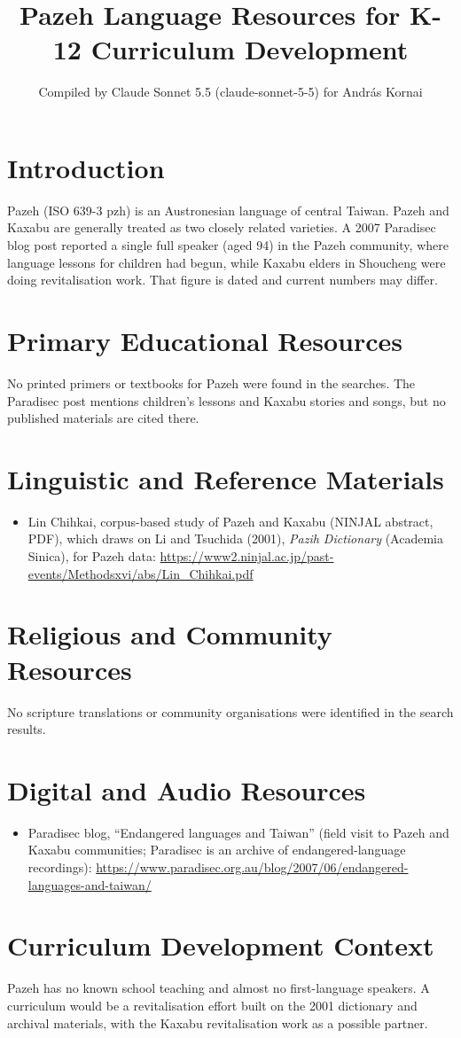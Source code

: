 \documentclass[12pt]{article}
\title{Pazeh Language Resources for K-12 Curriculum Development}
\author{Compiled by Claude Sonnet 5.5 (claude-sonnet-5-5) for Andr\'as Kornai}
\date{}
\begin{document}
\maketitle

\section{Introduction}
Pazeh (ISO 639-3 pzh) is an Austronesian language of central Taiwan. Pazeh and Kaxabu are generally treated as two closely related varieties. A 2007 Paradisec blog post reported a single full speaker (aged 94) in the Pazeh community, where language lessons for children had begun, while Kaxabu elders in Shoucheng were doing revitalisation work. That figure is dated and current numbers may differ.

\section{Primary Educational Resources}
No printed primers or textbooks for Pazeh were found in the searches. The Paradisec post mentions children's lessons and Kaxabu stories and songs, but no published materials are cited there.

\section{Linguistic and Reference Materials}
\begin{itemize}
\item Lin Chihkai, corpus-based study of Pazeh and Kaxabu (NINJAL abstract, PDF), which draws on Li and Tsuchida (2001), \emph{Pazih Dictionary} (Academia Sinica), for Pazeh data: \url{https://www2.ninjal.ac.jp/past-events/Methodsxvi/abs/Lin_Chihkai.pdf}
\end{itemize}

\section{Religious and Community Resources}
No scripture translations or community organisations were identified in the search results.

\section{Digital and Audio Resources}
\begin{itemize}
\item Paradisec blog, ``Endangered languages and Taiwan'' (field visit to Pazeh and Kaxabu communities; Paradisec is an archive of endangered-language recordings): \url{https://www.paradisec.org.au/blog/2007/06/endangered-languages-and-taiwan/}
\end{itemize}

\section{Curriculum Development Context}
Pazeh has no known school teaching and almost no first-language speakers. A curriculum would be a revitalisation effort built on the 2001 dictionary and archival materials, with the Kaxabu revitalisation work as a possible partner.
\end{document}
